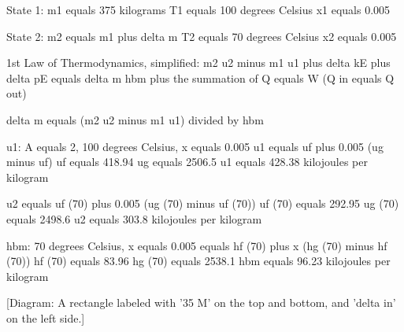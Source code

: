 State 1:  
m1 equals 375 kilograms  
T1 equals 100 degrees Celsius  
x1 equals 0.005  

State 2:  
m2 equals m1 plus delta m  
T2 equals 70 degrees Celsius  
x2 equals 0.005  

1st Law of Thermodynamics, simplified:  
m2 u2 minus m1 u1 plus delta kE plus delta pE equals delta m hbm plus the summation of Q equals W (Q in equals Q out)  

delta m equals (m2 u2 minus m1 u1) divided by hbm  

u1: A equals 2, 100 degrees Celsius, x equals 0.005  
u1 equals uf plus 0.005 (ug minus uf)  
uf equals 418.94  
ug equals 2506.5  
u1 equals 428.38 kilojoules per kilogram  

u2 equals uf (70) plus 0.005 (ug (70) minus uf (70))  
uf (70) equals 292.95  
ug (70) equals 2498.6  
u2 equals 303.8 kilojoules per kilogram  

hbm: 70 degrees Celsius, x equals 0.005  
equals hf (70) plus x (hg (70) minus hf (70))  
hf (70) equals 83.96  
hg (70) equals 2538.1  
hbm equals 96.23 kilojoules per kilogram  

[Diagram: A rectangle labeled with '35 M' on the top and bottom, and 'delta in' on the left side.]